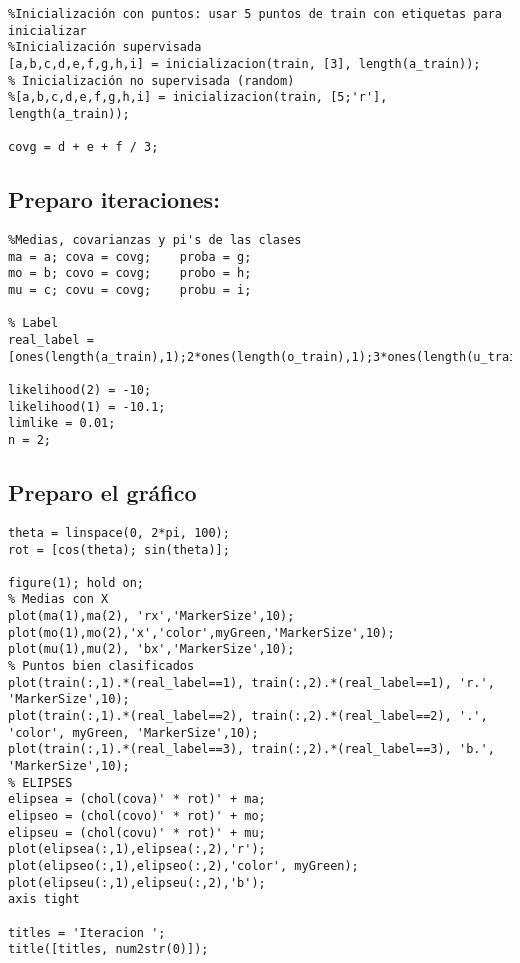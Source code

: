 \begin{lstlisting}
%Inicialización con puntos: usar 5 puntos de train con etiquetas para inicializar
%Inicialización supervisada
[a,b,c,d,e,f,g,h,i] = inicializacion(train, [3], length(a_train));
% Inicialización no supervisada (random)
%[a,b,c,d,e,f,g,h,i] = inicializacion(train, [5;'r'], length(a_train));

covg = d + e + f / 3;
\end{lstlisting}


{}
\subsection*{Preparo iteraciones:}

\begin{lstlisting}
%Medias, covarianzas y pi's de las clases
ma = a;	cova = covg;	proba = g;
mo = b;	covo = covg;	probo = h;
mu = c;	covu = covg;	probu = i;

% Label
real_label = [ones(length(a_train),1);2*ones(length(o_train),1);3*ones(length(u_train),1)];

likelihood(2) = -10;
likelihood(1) = -10.1;
limlike = 0.01;
n = 2;
\end{lstlisting}


{}
\subsection*{Preparo el gráfico}

\begin{lstlisting}
theta = linspace(0, 2*pi, 100);
rot = [cos(theta); sin(theta)];

figure(1); hold on;
% Medias con X
plot(ma(1),ma(2), 'rx','MarkerSize',10);
plot(mo(1),mo(2),'x','color',myGreen,'MarkerSize',10);
plot(mu(1),mu(2), 'bx','MarkerSize',10);
% Puntos bien clasificados
plot(train(:,1).*(real_label==1), train(:,2).*(real_label==1), 'r.', 'MarkerSize',10);
plot(train(:,1).*(real_label==2), train(:,2).*(real_label==2), '.', 'color', myGreen, 'MarkerSize',10);
plot(train(:,1).*(real_label==3), train(:,2).*(real_label==3), 'b.', 'MarkerSize',10);
% ELIPSES
elipsea = (chol(cova)' * rot)' + ma;
elipseo = (chol(covo)' * rot)' + mo;
elipseu = (chol(covu)' * rot)' + mu;
plot(elipsea(:,1),elipsea(:,2),'r');
plot(elipseo(:,1),elipseo(:,2),'color', myGreen);
plot(elipseu(:,1),elipseu(:,2),'b');
axis tight

titles = 'Iteracion ';
title([titles, num2str(0)]);
\end{lstlisting}


